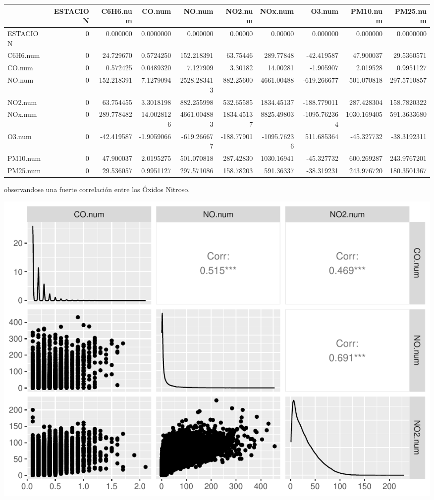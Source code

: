 \documentclass[notspecified,article,submit,moreauthors,pdftex]{Definitions/mdpi}
\begin{document}
\begin{tabular}{l|r|r|r|r|r|r|r|r|r}
\hline
  & ESTACION & C6H6.num & CO.num & NO.num & NO2.num & NOx.num & O3.num & PM10.num & PM25.num\\
\hline
ESTACION & 0 & 0.000000 & 0.0000000 & 0.000000 & 0.00000 & 0.00000 & 0.000000 & 0.000000 & 0.0000000\\
\hline
C6H6.num & 0 & 24.729670 & 0.5724250 & 152.218391 & 63.75446 & 289.77848 & -42.419587 & 47.900037 & 29.5360571\\
\hline
CO.num & 0 & 0.572425 & 0.0489320 & 7.127909 & 3.30182 & 14.00281 & -1.905907 & 2.019528 & 0.9951127\\
\hline
NO.num & 0 & 152.218391 & 7.1279094 & 2528.283413 & 882.25600 & 4661.00488 & -619.266677 & 501.070818 & 297.5710857\\
\hline
NO2.num & 0 & 63.754455 & 3.3018198 & 882.255998 & 532.65585 & 1834.45137 & -188.779011 & 287.428304 & 158.7820322\\
\hline
NOx.num & 0 & 289.778482 & 14.0028126 & 4661.004883 & 1834.45137 & 8825.49803 & -1095.762364 & 1030.169405 & 591.3633680\\
\hline
O3.num & 0 & -42.419587 & -1.9059066 & -619.266677 & -188.77901 & -1095.76236 & 511.685364 & -45.327732 & -38.3192311\\
\hline
PM10.num & 0 & 47.900037 & 2.0195275 & 501.070818 & 287.42830 & 1030.16941 & -45.327732 & 600.269287 & 243.9767201\\
\hline
PM25.num & 0 & 29.536057 & 0.9951127 & 297.571086 & 158.78203 & 591.36337 & -38.319231 & 243.976720 & 180.3501367\\
\hline
\end{tabular}

observandose una fuerte correlación entre los Óxidos Nitroso.

\includegraphics{ProyectoAED2023_files/figure-latex/unnamed-chunk-13-1.pdf}
\end{document}
